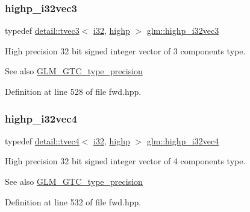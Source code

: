 \subsubsection{\texorpdfstring{highp\+\_\+i32vec3}{highp\_i32vec3}}
{\footnotesize\ttfamily typedef \hyperlink{structglm_1_1detail_1_1tvec3}{detail\+::tvec3}$<$ \hyperlink{group__gtc__type__precision_ga1d8ed5c43e91ea7d4528389da4fa9524}{i32}, \hyperlink{namespaceglm_a0f04f086094c747d227af4425893f545ac6f7eab42eacbb10d59a58e95e362074}{highp} $>$ \hyperlink{group__gtc__type__precision_ga95de80f73e676fb6b9976ff0d33bbc4b}{glm\+::highp\+\_\+i32vec3}}

High precision 32 bit signed integer vector of 3 components type. \begin{DoxySeeAlso}{See also}
\hyperlink{group__gtc__type__precision}{G\+L\+M\+\_\+\+G\+T\+C\+\_\+type\+\_\+precision} 
\end{DoxySeeAlso}


Definition at line 528 of file fwd.\+hpp.

\mbox{\label{group__gtc__type__precision_ga174af0fafdc5a9eb24150792bffa8b5c}} 
\subsubsection{\texorpdfstring{highp\+\_\+i32vec4}{highp\_i32vec4}}
{\footnotesize\ttfamily typedef \hyperlink{structglm_1_1detail_1_1tvec4}{detail\+::tvec4}$<$ \hyperlink{group__gtc__type__precision_ga1d8ed5c43e91ea7d4528389da4fa9524}{i32}, \hyperlink{namespaceglm_a0f04f086094c747d227af4425893f545ac6f7eab42eacbb10d59a58e95e362074}{highp} $>$ \hyperlink{group__gtc__type__precision_ga174af0fafdc5a9eb24150792bffa8b5c}{glm\+::highp\+\_\+i32vec4}}

High precision 32 bit signed integer vector of 4 components type. \begin{DoxySeeAlso}{See also}
\hyperlink{group__gtc__type__precision}{G\+L\+M\+\_\+\+G\+T\+C\+\_\+type\+\_\+precision} 
\end{DoxySeeAlso}


Definition at line 532 of file fwd.\+hpp.

\mbox{\label{group__gtc__type__precision_gad3cb9a0ac0266ea2c51c6fac256345d1}} 
